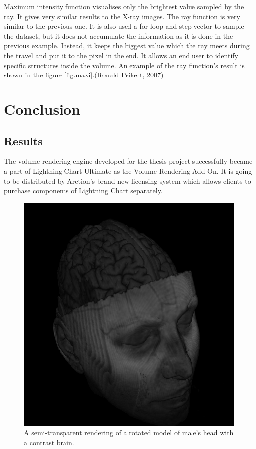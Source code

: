 \documentclass[twoside, english, 11pt]{report}
\begin{document}
Maximum intensity function visualises only the brightest value sampled by the ray. It gives very similar results to the X-ray images. The ray function is very similar to the previous one. It is also used a for-loop and step vector to sample the dataset, but it does not accumulate the information as it is done in the previous example. Instead, it keeps the biggest value which the ray meets during the travel and put it to the pixel in the end. It allows an end user to identify specific structures inside the volume. An example of the ray function's result is shown in the figure \ref{fig:maxi}.(Ronald Peikert, 2007)

\chapter{Conclusion}
\section{Results}
The volume rendering engine developed for the thesis project successfully became a part of Lightning Chart Ultimate as the Volume Rendering Add-On. It is going to be distributed by Arction's brand new licensing system which allows clients to purchase components of Lightning Chart separately.\\

\begin{figure}[H]
\centerline{\includegraphics[scale = 0.6]{img/brain}}
\caption{A semi-transparent rendering of a rotated model of male's head with a contrast brain.\label{fig:brain}}
\end{figure}
\end{document}
